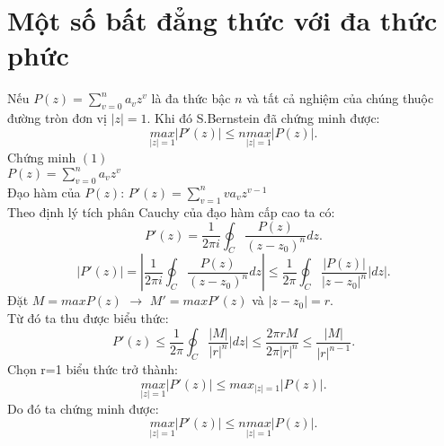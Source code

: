 \documentclass[a5paper,12pt]{report}%
\theoremstyle{definition}
\begin{document}
\section{Một số bất đẳng thức với đa thức phức}
\par
Nếu $P(z)=\sum_{v=0}^n a_vz^v$ là đa thức bậc $n$ và tất cả nghiệm của chúng thuộc đường tròn đơn vị $|z|=1$. Khi đó S.Bernstein \cite{milovanovic1999extremal} đã chứng minh được:
	\begin{equation} \label{(1.1)}
		\underset{|z|=1}{max}|P'(z)| \le n\underset{|z|=1}{max}|P(z)| .
	\end{equation} 
	Chứng minh $(1)$\\
	$P(z)=\sum_{v=0}^{n}a_vz^v$\\
	Đạo hàm của $P(z)$:
	$P'(z)=\sum_{v=1}^{n}va_vz^{v-1}$\\
	Theo định lý tích phân Cauchy của đạo hàm cấp cao ta có:\\
	\[P'(z)=\frac{1}{2\pi i} \oint_C\frac{P(z)}{(z-z_0)^n}dz.\]
	\[|P'(z)|=|\frac{1}{2 \pi i}\oint_C\frac{P(z)}{(z-z_0)^n}dz| \le \frac{1}{2 \pi }\oint_C \frac{|P(z)|}{|z-z_0|^n}|dz|.\]
	Đặt $M= max P(z)$ $\rightarrow$ $M'= max P'(z)$ và $|z-z_0|=r$.\\
	Từ đó ta thu được biểu thức:\\
	\[P'(z) \le \frac{1}{2\pi}\oint_C\frac{|M|}{|r|^n}|dz|\le \frac{2 \pi rM}{2\pi |r|^n }\le \frac{|M|}{|r|^{n-1}}.\]
	Chọn r=1 biểu thức trở thành:\\
	\[\underset{|z|=1}{max}|P'(z)| \le max_{|z|=1}|P(z)|.\]
	Do đó ta chứng minh được: \[\underset{|z|=1}{max}|P'(z)|\le n\underset{|z|=1}{max}|P(z)|.\]
\end{document}
